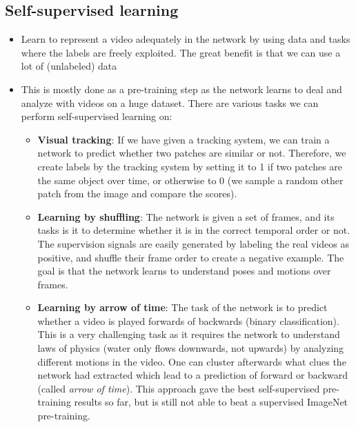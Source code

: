 \subsection{Self-supervised learning}
\begin{itemize}
	\item Learn to represent a video adequately in the network by using data and tasks where the labels are freely exploited. The great benefit is that we can use a lot of (unlabeled) data
	\item This is mostly done as a pre-training step as the network learns to deal and analyze with videos on a huge dataset. There are various tasks we can perform self-supervised learning on:
	\begin{itemize}
		\item \textbf{Visual tracking}: If we have given a tracking system, we can train a network to predict whether two patches are similar or not. Therefore, we create labels by the tracking system by setting it to 1 if two patches are the same object over time, or otherwise to 0 (we sample a random other patch from the image and compare the scores).
		\item \textbf{Learning by shuffling}: The network is given a set of frames, and its tasks is it to determine whether it is in the correct temporal order or not. The supervision signals are easily generated by labeling the real videos as positive, and shuffle their frame order to create a negative example. The goal is that the network learns to understand poses and motions over frames.
		\item \textbf{Learning by arrow of time}: The task of the network is to predict whether a video is played forwards of backwards (binary classification). This is a very challenging task as it requires the network to understand laws of physics (water only flows downwards, not upwards) by analyzing different motions in the video. One can cluster afterwards what clues the network had extracted which lead to a prediction of forward or backward (called \textit{arrow of time}). This approach gave the best self-supervised pre-training results so far, but is still not able to beat a supervised ImageNet pre-training.   
	\end{itemize}
\end{itemize}